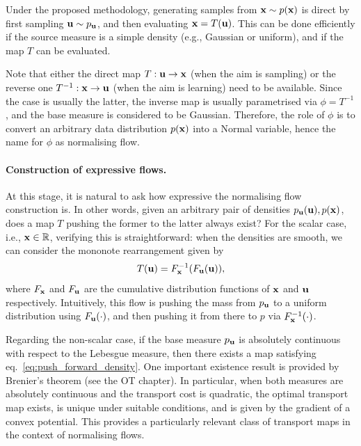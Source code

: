\begin{remark}[Sampling]
Under the proposed methodology, generating samples from ${ \mathbf{x}}\sim p({ \mathbf{x}})$ is direct by first sampling ${ \mathbf{u}}\sim p_{ \mathbf{u}}$, and then evaluating ${ \mathbf{x}} = T({ \mathbf{u}})$. This can be done efficiently if the source measure is a simple density (e.g., Gaussian or uniform), and if the map $T$ can be evaluated.
\end{remark}

\begin{remark}
Note that either the direct map $T:{ \mathbf{u}}\to{ \mathbf{x}}$ (when the aim is sampling) or the reverse one $T^{-1}:{ \mathbf{x}}\to{ \mathbf{u}}$ (when the aim is learning) need to be available. Since the case is usually the latter, the inverse map is usually parametrised via $\phi=T^{-1}$, and the base measure is considered to be Gaussian. Therefore, the role of $\phi$ is to convert an arbitrary data distribution $p({ \mathbf{x}})$ into a Normal variable, hence the name for $\phi$ as normalising flow.
\end{remark}




\paragraph{Construction of expressive flows.}

At this stage, it is natural to ask how expressive the normalising flow construction is. In other words, given an arbitrary pair of densities $p_{ \mathbf{u}}({ \mathbf{u}}), p({ \mathbf{x}})$, does a map $T$ pushing the former to the latter always exist? For the scalar case, i.e., ${ \mathbf{x}}\in{\mathbb R}$, verifying this is straightforward: when the densities are smooth, we can consider the mononote rearrangement given by 
\begin{equation}
    T({ \mathbf{u}}) = F^{-1}_{ \mathbf{x}}(F_{ \mathbf{u}}({ \mathbf{u}})),
\end{equation}
where $F_{ \mathbf{x}}$ and $F_{ \mathbf{u}}$ are the cumulative distribution functions of ${ \mathbf{x}}$ and ${ \mathbf{u}}$ respectively. Intuitively, this flow is pushing the mass from $p_{ \mathbf{u}}$ to a uniform distribution using $F_{ \mathbf{u}}(\cdot)$, and then pushing it from there to $p$ via $F^{-1}_{ \mathbf{x}}(\cdot)$. 


Regarding the non-scalar case, if the base measure \(p_{ \mathbf{u}}\) is absolutely continuous with respect to the Lebesgue measure, then there exists a map satisfying eq.~\eqref{eq:push_forward_density}. One important existence result is provided by Brenier's theorem (see the OT chapter). In particular, when both measures are absolutely continuous and the transport cost is quadratic, the optimal transport map exists, is unique under suitable conditions, and is given by the gradient of a convex potential. This provides a particularly relevant class of transport maps in the context of normalising flows.

